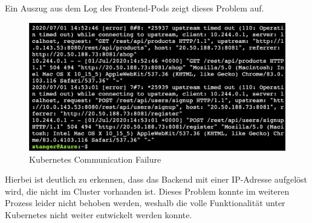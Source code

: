Ein Auszug aus dem Log des Frontend-Pods zeigt dieses Problem auf.

\begin{figure}[h!]
 \centering
 \includegraphics[width=150mm]{images/kubernetes-failure.png}
 \caption{Kubernetes Communication Failure}
 \label{fig:kubernetes-failure}
\end{figure}

Hierbei ist deutlich zu erkennen, dass das Backend mit einer IP-Adresse aufgelöst wird, die nicht im Cluster vorhanden ist. Dieses Problem konnte im weiteren Prozess leider nicht behoben werden, weshalb die volle Funktionalität unter Kubernetes nicht weiter entwickelt werden konnte.